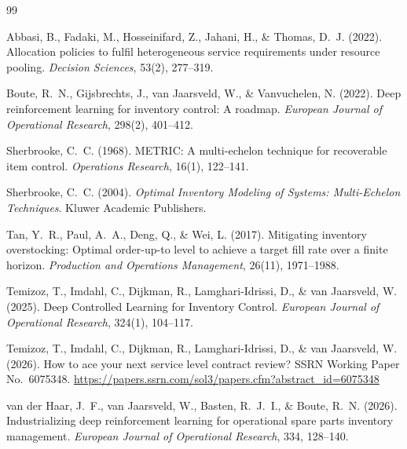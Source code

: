 \documentclass[11pt, a4paper]{article}
\theoremstyle{definition}
\theoremstyle{remark}
\begin{document}
\newpage


\begin{thebibliography}{99}

Abbasi, B., Fadaki, M., Hosseinifard, Z., Jahani, H., \& Thomas, D.~J. (2022).
Allocation policies to fulfil heterogeneous service requirements under resource pooling.
\textit{Decision Sciences}, 53(2), 277--319.

Boute, R.~N., Gijsbrechts, J., van Jaarsveld, W., \& Vanvuchelen, N. (2022).
Deep reinforcement learning for inventory control: A roadmap.
\textit{European Journal of Operational Research}, 298(2), 401--412.

Sherbrooke, C.~C. (1968).
METRIC: A multi-echelon technique for recoverable item control.
\textit{Operations Research}, 16(1), 122--141.

Sherbrooke, C.~C. (2004).
\textit{Optimal Inventory Modeling of Systems: Multi-Echelon Techniques}.
Kluwer Academic Publishers.

Tan, Y.~R., Paul, A.~A., Deng, Q., \& Wei, L. (2017).
Mitigating inventory overstocking: Optimal order-up-to level to achieve a target fill rate over a finite horizon.
\textit{Production and Operations Management}, 26(11), 1971--1988.

Temizoz, T., Imdahl, C., Dijkman, R., Lamghari-Idrissi, D., \& van Jaarsveld, W. (2025).
Deep Controlled Learning for Inventory Control.
\textit{European Journal of Operational Research}, 324(1), 104--117.

Temizoz, T., Imdahl, C., Dijkman, R., Lamghari-Idrissi, D., \& van Jaarsveld, W. (2026).
How to ace your next service level contract review?
SSRN Working Paper No.~6075348. \url{https://papers.ssrn.com/sol3/papers.cfm?abstract_id=6075348}

van der Haar, J.~F., van Jaarsveld, W., Basten, R.~J.~I., \& Boute, R.~N. (2026).
Industrializing deep reinforcement learning for operational spare parts inventory management.
\textit{European Journal of Operational Research}, 334, 128--140.

\end{thebibliography}
\end{document}
